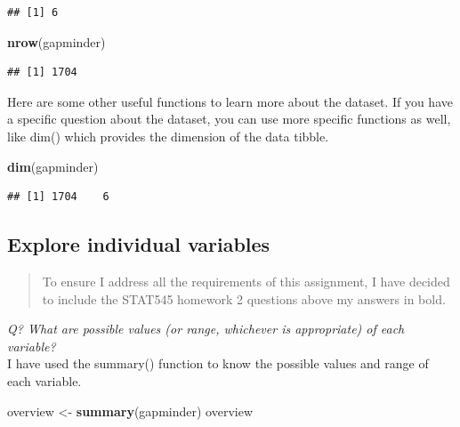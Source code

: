 \documentclass[]{article}
\newenvironment{Shaded}{\begin{snugshade}}{\end{snugshade}}
\newcommand{\KeywordTok}[1]{\textcolor[rgb]{0.13,0.29,0.53}{\textbf{{#1}}}}
\newcommand{\StringTok}[1]{\textcolor[rgb]{0.31,0.60,0.02}{{#1}}}
\newcommand{\NormalTok}[1]{{#1}}
\begin{document}
\begin{verbatim}
## [1] 6
\end{verbatim}

\begin{Shaded}
\begin{Highlighting}[]
\KeywordTok{nrow}\NormalTok{(gapminder)}
\end{Highlighting}
\end{Shaded}

\begin{verbatim}
## [1] 1704
\end{verbatim}

Here are some other useful functions to learn more about the dataset. If
you have a specific question about the dataset, you can use more
specific functions as well, like dim() which provides the dimension of
the data tibble.

\begin{Shaded}
\begin{Highlighting}[]
\KeywordTok{dim}\NormalTok{(gapminder)}
\end{Highlighting}
\end{Shaded}

\begin{verbatim}
## [1] 1704    6
\end{verbatim}

\subsection{Explore individual
variables}\label{explore-individual-variables}

\begin{quote}
To ensure I address all the requirements of this assignment, I have
decided to include the STAT545 homework 2 questions above my answers in
bold.
\end{quote}

\emph{Q? What are possible values (or range, whichever is appropriate)
of each variable?}\\
I have used the summary() function to know the possible values and range
of each variable.

\begin{Shaded}
\begin{Highlighting}[]
\NormalTok{overview <-}\StringTok{ }\KeywordTok{summary}\NormalTok{(gapminder)}
\NormalTok{overview}
\end{Highlighting}
\end{Shaded}
\end{document}
